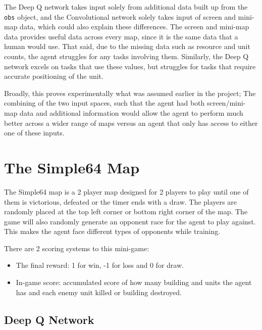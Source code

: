 The Deep Q network takes input solely from additional data built up from the
\texttt{obs} object, and the Convolutional network solely takes input of screen
and mini-map data, which could also explain these differences. The screen and
mini-map data provides useful data across every map, since it is the same data
that a human would use. That said, due to the missing data such as resource and
unit counts, the agent struggles for any tasks involving them. Similarly, the
Deep Q network excels on tasks that use these values, but struggles for tasks
that require accurate positioning of the unit.

Broadly, this proves experimentally what was assumed earlier in the project;
The combining of the two input spaces, such that the agent had both
screen/mini-map data and additional information would allow the agent to perform
much better across a wider range of maps versus an agent that only has access to
either one of these inputs.

\section{The Simple64 Map}

The Simple64 map is a 2 player map designed for 2 players to play until one of them is victorious, defeated or the timer ends with a draw. The players are randomly placed at the top left corner or bottom right corner of the map. The game will also randomly generate an opponent race for the agent to play against. This makes the agent face different types of opponents while training.

There are 2 scoring systems to this mini-game:
\begin{itemize}
\item The final reward: 1 for win, -1 for loss and 0 for draw.

\item In-game score: accumulated score of how many building and units the agent has and each enemy unit killed or building destroyed.

\end{itemize}


\subsection{Deep Q Network}


